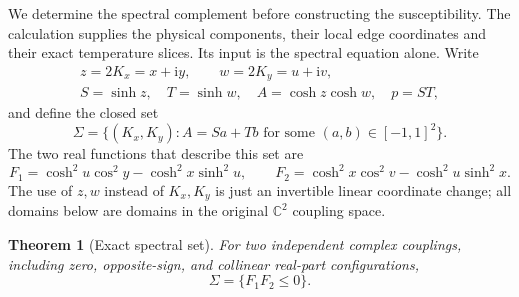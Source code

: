 \documentclass[11pt]{article}
\numberwithin{equation}{section}
\newtheorem{theorem}{Theorem}[section]
\theoremstyle{definition}
\newcommand{\C}{\mathbb C}
\newcommand{\ii}{\mathrm i}
\begin{document}
We determine the spectral complement before constructing the
susceptibility. The calculation supplies the physical components, their
local edge coordinates and their exact temperature slices. Its input
is the spectral equation alone. Write
\[
 \begin{gathered}
 z=2K_x=x+\ii y,\qquad w=2K_y=u+\ii v,\\
 S=\sinh z,\quad T=\sinh w,\quad A=\cosh z\cosh w,\quad p=ST,
 \end{gathered}
\]
and define the closed set
\begin{equation}\label{geo:sigma}
 \Sigma=\{(K_x,K_y):A=S a+T b
                    \text{ for some }(a,b)\in[-1,1]^2\}.
\end{equation}
The two real functions that describe this set are
\begin{equation}\label{geo:F}
 F_1=\cosh^2u\cos^2y-\cosh^2x\sinh^2u,\qquad
 F_2=\cosh^2x\cos^2v-\cosh^2u\sinh^2x.
\end{equation}
The use of \(z,w\) instead of \(K_x,K_y\) is just an invertible linear
coordinate change; all domains below are domains in the original
\(\C^2\) coupling space.

\begin{theorem}[Exact spectral set]\label{geo:exact-sigma}
For two independent complex couplings, including zero, opposite-sign,
and collinear real-part configurations,
\begin{equation}\label{geo:sigma-F}
                         \Sigma=\{F_1F_2\leq0\}.
\end{equation}
\end{theorem}
\end{document}
